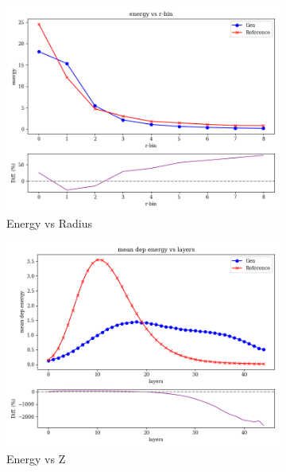 \begin{figure}[htbp]
    \centering
    \begin{subfigure}[b]{0.3\textwidth}
        \centering
        \includegraphics[width=\textwidth]{Figures/robust2.png}
        \caption{Energy vs Radius}
        \label{fig:robust2}
    \end{subfigure}
    \hfill
    \begin{subfigure}[b]{0.3\textwidth}
        \centering
        \includegraphics[width=\textwidth]{Figures/robust3.png}
        \caption{Energy vs Z}
        \label{fig:robust3}
    \end{subfigure}
    \hfill
    \begin{subfigure}[b]{0.3\textwidth}

\end{subfigure}
\end{figure}
